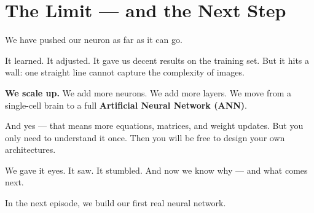 \documentclass[11pt]{article}
\begin{document}
\vspace{1em}

\section*{The Limit — and the Next Step}

\vspace{0.5em}

We have pushed our neuron as far as it can go.

It learned. It adjusted. It gave us decent results on the training set.  
But it hits a wall: one straight line cannot capture the complexity of images.

\begin{tcolorbox}[colback=gray!5, colframe=black!50, title=What do we do?]
\textbf{We scale up.}  
We add more neurons. We add more layers.  
We move from a single-cell brain to a full \textbf{Artificial Neural Network (ANN)}.
\end{tcolorbox}

\vspace{1em}

\begin{center}
\end{center}

\vspace{0.5em}

And yes — that means more equations, matrices, and weight updates.  
But you only need to understand it once.  
Then you will be free to design your own architectures.

\vspace{1em}

We gave it eyes. It saw. It stumbled. And now we know why — and what comes next.

\vspace{0.5em}

In the next episode, we build our first real neural network.
\end{document}
